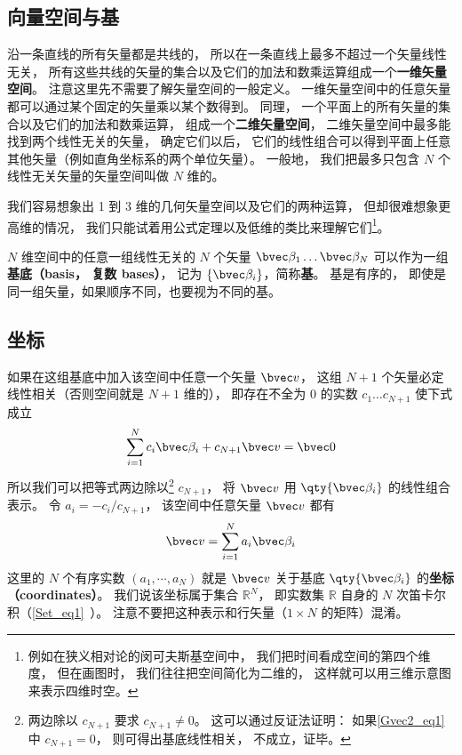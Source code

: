 \subsection{向量空间与基}
沿一条直线的所有矢量都是共线的， 所以在一条直线上最多不超过一个矢量线性无关， 所有这些共线的矢量的集合以及它们的加法和数乘运算组成一个\textbf{一维矢量空间}。 注意这里先不需要了解矢量空间的一般定义。 一维矢量空间中的任意矢量都可以通过某个固定的矢量乘以某个数得到。 同理， 一个平面上的所有矢量的集合以及它们的加法和数乘运算， 组成一个\textbf{二维矢量空间}， 二维矢量空间中最多能找到两个线性无关的矢量， 确定它们以后， 它们的线性组合可以得到平面上任意其他矢量（例如直角坐标系的两个单位矢量）。 一般地， 我们把最多只包含 $N$ 个线性无关矢量的矢量空间叫做 $N$ 维的。

我们容易想象出 1 到 3 维的几何矢量空间以及它们的两种运算， 但却很难想象更高维的情况， 我们只能试着用公式定理以及低维的类比来理解它们\footnote{例如在狭义相对论的闵可夫斯基空间中， 我们把时间看成空间的第四个维度， 但在画图时， 我们往往把空间简化为二维的， 这样就可以用三维示意图来表示四维时空。}。

$N$ 维空间中的任意一组线性无关的 $N$ 个矢量 $\bvec \beta_1\dots \bvec \beta_N$ 可以作为一组\textbf{基底（basis， 复数 bases）}， 记为 $\{\bvec \beta_i\}$，简称\textbf{基}。 基是有序的， 即使是同一组矢量，如果顺序不同，也要视为不同的基。

\subsection{坐标}
如果在这组基底中加入该空间中任意一个矢量 $\bvec v$， 这组 $N+1$ 个矢量必定线性相关（否则空间就是 $N+1$ 维的）， 即存在不全为 0 的实数 $c_1\dots c_{N+1}$ 使下式成立
\begin{equation}\label{Gvec2_eq1}
\sum_{i=1}^{N} c_i \bvec \beta_i + c_{N+1} \bvec v = \bvec 0
\end{equation}
所以我们可以把等式两边除以\footnote{两边除以 $c_{N+1}$ 要求 $c_{N+1} \ne 0$。 这可以通过反证法证明： 如果\autoref{Gvec2_eq1} 中 $c_{N+1} = 0$， 则可得出基底线性相关， 不成立，证毕。} $c_{N+1}$， 将 $\bvec v$ 用 $\qty{\bvec \beta_i}$ 的线性组合表示。 令 $a_i = -c_i/c_{N+1}$， 该空间中任意矢量 $\bvec v$ 都有
\begin{equation}\label{Gvec2_eq5}
\bvec v = \sum_{i=1}^N a_i \bvec \beta_i
\end{equation}
这里的 $N$ 个有序实数 $(a_1, \cdots, a_N)$ 就是 $\bvec v$ 关于基底 $\qty{\bvec \beta_i}$ 的\textbf{坐标（coordinates）}。 我们说该坐标属于集合 $\mathbb R^N$， 即实数集 $\mathbb R$ 自身的 $N$ 次笛卡尔积（\autoref{Set_eq1}~）。 注意不要把这种表示和行矢量（$1\times N$ 的矩阵）混淆。

